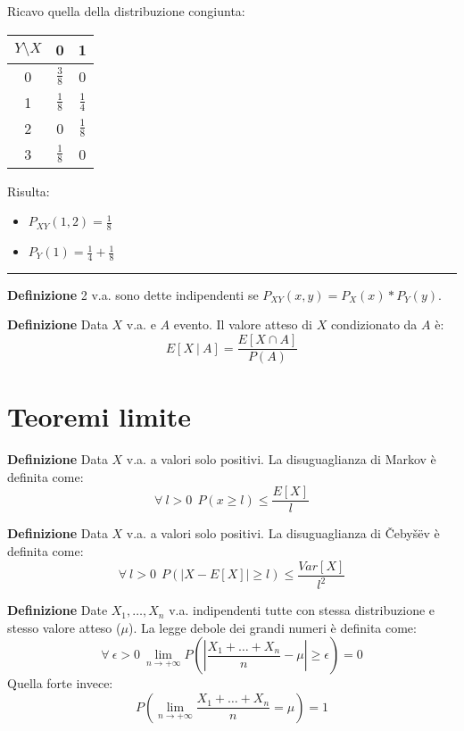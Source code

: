 \documentclass{article}
\begin{document}
Ricavo quella della distribuzione congiunta:

\begin{table}[ht]
    \centering
    \begin{tabular}{c|cc}
        $Y\setminus X$ & 0 & 1\\
        \hline
        \rule{0pt}{3ex}0 & $\frac{3}{8}$ & 0\\[1ex]
        \hline
        \rule{0pt}{3ex}1 & $\frac{1}{8}$ & $\frac{1}{4}$\\[1ex]
        \hline
        \rule{0pt}{3ex}2 & 0 & $\frac{1}{8}$\\[1ex]
        \hline
        \rule{0pt}{3ex}3 & $\frac{1}{8}$ & 0\\
    \end{tabular}
    \label{tab:cong2}
\end{table}

Risulta:
\begin{itemize}
    \item $P_{XY}(1,2)=\frac{1}{8}$
    \item $P_Y(1)=\frac{1}{4}+\frac{1}{8}$
\end{itemize}

\noindent\rule{\textwidth}{0.5pt}\newline

\noindent\textbf{Definizione} 2 v.a. sono dette indipendenti se $P_{XY}(x,y)=P_X(x)*P_Y(y)$.\newline

\noindent\textbf{Definizione} Data $X$ v.a. e $A$ evento. Il valore atteso di $X$ condizionato da $A$ è:
$$E[X\ |\ A]=\frac{E[X\cap A]}{P(A)}$$

\section{Teoremi limite}

\textbf{Definizione} Data $X$ v.a. a valori solo positivi. La disuguaglianza di Markov è definita come:
$$\forall\ l>0\ \ P(x\geq l)\leq\frac{E[X]}{l}$$\newline

\noindent\textbf{Definizione} Data $X$ v.a. a valori solo positivi. La disuguaglianza di Čebyšëv è definita come:
$$\forall\ l>0\ \ P(|X-E[X]|\geq l)\leq\frac{Var[X]}{l^2}$$\newline

\noindent\textbf{Definizione} Date $X_1,\ldots,X_n$ v.a. indipendenti tutte con stessa distribuzione e stesso valore atteso ($\mu$). La legge debole dei grandi numeri è definita come:
$$\forall\ \epsilon>0\ \lim_{n\rightarrow+\infty}P\left(\left|\frac{X_1+\ldots+X_n}{n}-\mu\right|\geq\epsilon\right)=0$$
\noindent Quella forte invece:
$$P\left(\lim_{n\rightarrow+\infty}\frac{X_1+\ldots+X_n}{n}=\mu\right)=1$$\newline
\end{document}
